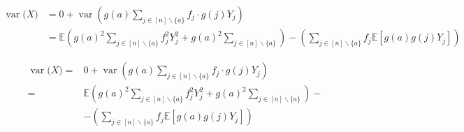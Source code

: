 \documentclass[xcolor={rgb}]{beamer}
\newcommand{\var}[1]{\operatorname{var}{\!#1}}
\begin{document}
\begin{frame}[t]
{\small\begin{align*}
\var(X) &= 0 + \var{\left(g(a) \sum_{j\in[n]\backslash\{a\}} f_j\cdot g(j) Y_j\right)}\\ 
&= \mathbb{E}\left( g(a)^2 \sum_{j\in[n]\backslash\{a\}} f^2_j Y^2_j + g(a)^2 \sum_{j\in[n]\backslash\{a\}} \right) - \left(\sum_{j\in[n]\backslash\{a\}} f_j \mathbb{E}[g(a)g(j)Y_j]\right)
\end{align*}}
\end{frame}

\begin{frame}[t]
\begin{align*}
\var(X) = & 0 + \var{\left(g(a) \sum_{j\in[n]\backslash\{a\}} f_j\cdot g(j) Y_j\right)}\\ 
= & \mathbb{E}\left( g(a)^2 \sum_{j\in[n]\backslash\{a\}} f^2_j Y^2_j + g(a)^2 \sum_{j\in[n]\backslash\{a\}} \right) -\\
&- \left(\sum_{j\in[n]\backslash\{a\}} f_j \mathbb{E}[g(a)g(j)Y_j]\right)
\end{align*}
\end{frame}
\end{document}
